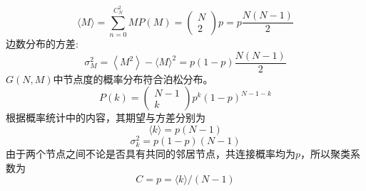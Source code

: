 \begin{equation}
    \langle M\rangle=\sum_{n=0}^{C^2_N} M P(M)=\left(\begin{array}{l}
    N \\
    2
    \end{array}\right) p=p \frac{N(N-1)}{2}
    \end{equation}
边数分布的方差:
\begin{equation}
    \sigma_M^2=\left\langle M^2\right\rangle-\langle M\rangle^2=p(1-p) \frac{N(N-1)}{2}
\end{equation}
$G(N,M)$中节点度的概率分布符合泊松分布。
\begin{equation}
    P(k)=\left(\begin{array}{c}
    N-1 \\
    k
    \end{array}\right) p^k(1-p)^{N-1-k}
\end{equation}
根据概率统计中的内容，其期望与方差分别为
\begin{equation}
    \langle k\rangle=p(N-1)
\end{equation}
\begin{equation}
    \sigma_k^2=p(1-p)(N-1)
\end{equation}
由于两个节点之间不论是否具有共同的邻居节点，共连接概率均为$p$，所以聚类系数为
\begin{equation}
    C=p=\langle k\rangle /(N-1)
\end{equation}
